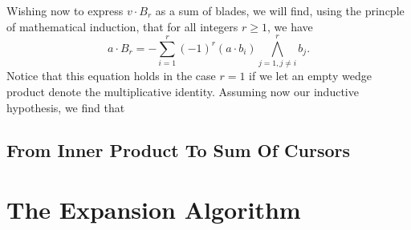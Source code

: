 \documentclass{birkjour}
\theoremstyle{definition}
\theoremstyle{remark}
\numberwithin{equation}{section}
\begin{document}
Wishing now to express $v\cdot B_r$ as a sum of blades, we will find, using
the princple of mathematical induction, that for all integers $r\geq 1$, we have
\begin{equation}
a\cdot B_r = -\sum_{i=1}^r(-1)^r(a\cdot b_i)\bigwedge_{j=1,j\neq i}^rb_j.
\end{equation}
Notice that this equation holds in the case $r=1$ if we let an empty wedge product
denote the multiplicative identity.  Assuming now our inductive hypothesis, we find that


\subsection{From Inner Product To Sum Of Cursors}

\section{The Expansion Algorithm}

\end{document}
